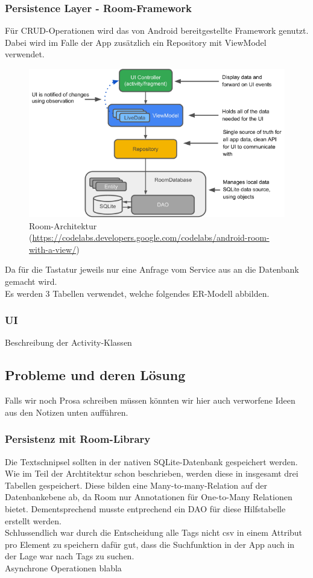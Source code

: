 \documentclass[11pt]{article}
\begin{document}
	
	
	\subsubsection{Persistence Layer - Room-Framework}
	Für CRUD-Operationen wird das von Android bereitgestellte Framework genutzt. Dabei wird im Falle der App zusätzlich ein Repository mit ViewModel verwendet. 
	\begin{figure}[H]
		\centering
		\includegraphics[width=1.0\textwidth]{Konzepte/roomArch.png}
		\caption{Room-Architektur (\sloppy\url{https://codelabs.developers.google.com/codelabs/android-room-with-a-view/})}
		\label{fig:room_arch}
	\end{figure}
	Da für die Tastatur jeweils nur eine Anfrage vom Service aus an die Datenbank gemacht wird.\\
	Es werden 3 Tabellen verwendet, welche folgendes ER-Modell abbilden.
	
	\subsubsection{UI}
	Beschreibung der Activity-Klassen
	
	
	\subsection{Probleme und deren Lösung}
	Falls wir noch Prosa schreiben müssen könnten wir hier auch verworfene Ideen aus den Notizen unten aufführen.
	\subsubsection{Persistenz mit Room-Library}
	Die Textschnipsel sollten in der nativen SQLite-Datenbank gespeichert werden. Wie im Teil der Archtitektur schon beschrieben, werden diese in insgesamt drei Tabellen gespeichert. Diese bilden eine Many-to-many-Relation auf der Datenbankebene ab, da Room nur Annotationen für One-to-Many Relationen bietet. Dementsprechend musste entprechend ein DAO für diese Hilfstabelle erstellt werden. \\
	Schlussendlich war durch die Entscheidung alle Tags nicht csv in einem Attribut pro Element zu speichern dafür gut, dass die Suchfunktion in der App auch in der Lage war nach Tags zu suchen.\\
	Asynchrone Operationen blabla
\end{document}
